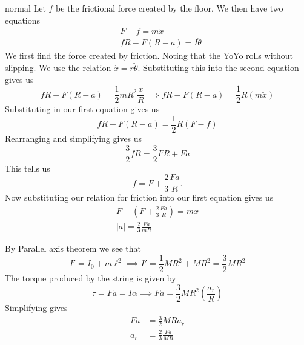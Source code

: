 \begin{solution}{normal}
Let $f$ be the frictional force created by the floor. We then have two equations
\begin{align*}
&F-f=m\ddot x\\
&fR - F(R-a) = I \ddot\theta
\end{align*}We first find the force created by friction. Noting that the YoYo rolls without slipping. We use the relation $\ddot x = r\ddot\theta$. Substituting this into the second equation gives us
\[
fR- F(R - a) = \frac{1}{2}mR^2\frac{\ddot x}{R}\implies fR- F(R - a) = \frac{1}{2}R(m\ddot x)
\]Substituting in our first equation gives us
\[
fR - F(R - a) = \frac{1}{2}R(F -f)
\]Rearranging and simplifying gives us
\[
\frac{3}{2}fR = \frac{3}{2}FR + Fa
\]This tells us
\[
f = F + \frac{2}{3}\frac{Fa}{R}.
\]Now substituting our relation for friction into our first equation gives us
\begin{align*}
F - \left(F + \frac{2}{3}\frac{Fa}{R}\right) = m\ddot x\\
\boxed{|a|= \frac{2}{3}\frac{Fa}{mR}}
\end{align*}

\tcbline 

By Parallel axis theorem we see that 
\[I' = I_0 + m\ell^2 \implies I' = \frac{1}{2}MR^2 + MR^2 = \frac{3}{2}MR^2\]
The torque produced by the string is given by 
\[\tau = Fa = I\alpha\implies Fa = \frac{3}{2}MR^2\left(\frac{a_r}{R}\right)\]
Simplifying gives 
\begin{align*}
Fa &= \frac{3}{2}MRa_r\\
a_r &= \boxed{\frac{2}{3}\frac{Fa}{MR}}
\end{align*}
\end{solution}
